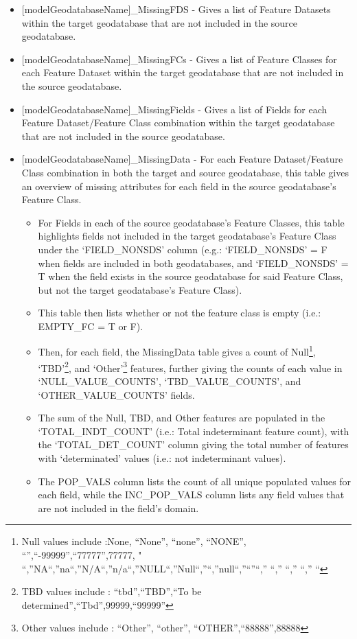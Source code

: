 \documentclass[openany]{book}
\providecommand{\tightlist}{%
  \setlength{\itemsep}{0pt}\setlength{\parskip}{0pt}}
\let\rmarkdownfootnote\footnote%
\def\footnote{\protect\rmarkdownfootnote}
\theoremstyle{definition}
\theoremstyle{definition}
\theoremstyle{definition}
\theoremstyle{remark}
\begin{document}
\begin{itemize}
\tightlist
\item
  {[}modelGeodatabaseName{]}\_MissingFDS - Gives a list of Feature
  Datasets within the target geodatabase that are not included in the
  source geodatabase.\\
\item
  {[}modelGeodatabaseName{]}\_MissingFCs - Gives a list of Feature
  Classes for each Feature Dataset within the target geodatabase that
  are not included in the source geodatabase.\\
\item
  {[}modelGeodatabaseName{]}\_MissingFields - Gives a list of Fields for
  each Feature Dataset/Feature Class combination within the target
  geodatabase that are not included in the source geodatabase.\\
\item
  {[}modelGeodatabaseName{]}\_MissingData - For each Feature
  Dataset/Feature Class combination in both the target and source
  geodatabase, this table gives an overview of missing attributes for
  each field in the source geodatabase's Feature Class.

  \begin{itemize}
  \tightlist
  \item
    For Fields in each of the source geodatabase's Feature Classes, this
    table highlights fields not included in the target geodatabase's
    Feature Class under the `FIELD\_NONSDS' column (e.g.:
    `FIELD\_NONSDS' = F when fields are included in both geodatabases,
    and `FIELD\_NONSDS' = T when the field exists in the source
    geodatabase for said Feature Class, but not the target geodatabase's
    Feature Class).
  \item
    This table then lists whether or not the feature class is empty
    (i.e.: EMPTY\_FC = T or F).
  \item
    Then, for each field, the MissingData table gives a count of
    Null\footnote{Null values include :None, ``None'', ``none'',
      ``NONE'', ``'',``-99999'',``77777'',77777, "
      ``,''NA``,''na``,''N/A``,''n/a``,''NULL``,''Null``,''``,''null``,''``''``,''
      ``,'' ``,'' ``,'' ``}, `TBD'\footnote{TBD values include :
      ``tbd'',``TBD'',``To be determined'',``Tbd'',99999,``99999''}, and
    `Other'\footnote{Other values include : ``Other'', ``other'',
      ``OTHER'',``88888'',88888} features, further giving the counts of
    each value in `NULL\_VALUE\_COUNTS', `TBD\_VALUE\_COUNTS', and
    `OTHER\_VALUE\_COUNTS' fields.
  \item
    The sum of the Null, TBD, and Other features are populated in the
    `TOTAL\_INDT\_COUNT' (i.e.: Total indeterminant feature count), with
    the `TOTAL\_DET\_COUNT' column giving the total number of features
    with `determinated' values (i.e.: not indeterminant values).
  \item
    The POP\_VALS column lists the count of all unique populated values
    for each field, while the INC\_POP\_VALS column lists any field
    values that are not included in the field's domain.
  \end{itemize}
\end{itemize}
\end{document}
